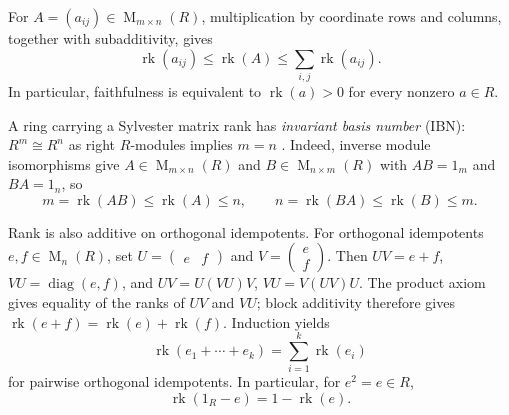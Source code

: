\documentclass[11pt]{amsart}
\DeclareMathOperator{\rk}{rk}
\DeclareMathOperator{\Mat}{M}
\DeclareMathOperator{\diag}{diag}
\theoremstyle{definition}
\theoremstyle{remark}
\begin{document}
For $A=(a_{ij})\in\Mat_{m\times n}(R)$, multiplication by coordinate rows
and columns, together with subadditivity, gives
\[
 \rk(a_{ij})\leq\rk(A)\leq\sum_{i,j}\rk(a_{ij}).
\]
In particular, faithfulness is equivalent to $\rk(a)>0$ for every nonzero $a\in R$.

A ring carrying a Sylvester matrix rank has \emph{invariant basis number}
(IBN): $R^m\cong R^n$ as right $R$-modules implies $m=n$
\cite[Section~3]{JiangLi2021}.  Indeed, inverse module isomorphisms give
$A\in\Mat_{m\times n}(R)$ and $B\in\Mat_{n\times m}(R)$ with
$AB=1_m$ and $BA=1_n$, so
\[
 m=\rk(AB)\leq\rk(A)\leq n,\qquad
 n=\rk(BA)\leq\rk(B)\leq m.
\]

Rank is also additive on orthogonal idempotents.  For orthogonal
idempotents $e,f\in\Mat_n(R)$, set
$U=\begin{pmatrix}e&f\end{pmatrix}$ and
$V=\begin{pmatrix}e\\f\end{pmatrix}$.
Then $UV=e+f$, $VU=\diag(e,f)$, and
$UV=U(VU)V$, $VU=V(UV)U$.
The product axiom gives equality of the ranks of $UV$ and $VU$;
block additivity therefore gives $\rk(e+f)=\rk(e)+\rk(f)$.
Induction yields
\[
 \rk(e_1+\cdots+e_k)=\sum_{i=1}^k\rk(e_i)
\]
for pairwise orthogonal idempotents.  In particular, for $e^2=e\in R$,
\begin{equation}\label{eq:idempotent-complement-rank}
 \rk(1_R-e)=1-\rk(e).
\end{equation}
\end{document}
